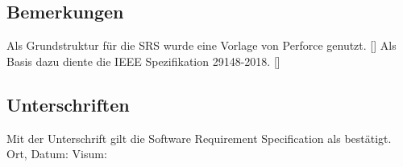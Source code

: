 \subsection{Bemerkungen}
Als Grundstruktur für die SRS wurde eine Vorlage von Perforce genutzt. [\cite{srsdocument}]
Als Basis dazu diente die IEEE Spezifikation 29148-2018. [\cite{ieeeSrs}]

\subsection{Unterschriften}
Mit der Unterschrift gilt die Software Requirement Specification als bestätigt.\\

Ort, Datum:	\underline{\hspace*{6cm}}	\hspace*{1cm} Visum:	\underline{\hspace*{4cm}}


\newpage
